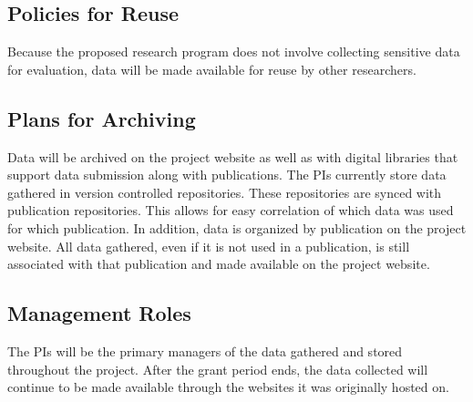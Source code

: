 \subsection*{Policies for Reuse}  
Because the proposed research program does not involve collecting sensitive
data for evaluation, data will be made available for reuse by other researchers.

\subsection*{Plans for Archiving} 
Data will be archived on the project website as well as with digital
libraries that support data submission along with publications.  The PIs currently store data gathered in
version controlled repositories. These repositories are synced with
publication repositories.  This allows for easy correlation of which data was used for which publication.  In addition, data is organized
by publication on the project website.  All data gathered, even if it is not
used in a publication, is still associated with that publication and made available on the project website.  

\subsection*{Management Roles}
The PIs will be the primary managers of the data gathered and stored throughout the project.  After the grant period ends, the data collected will continue
to be made available through the websites it was originally hosted on. 



